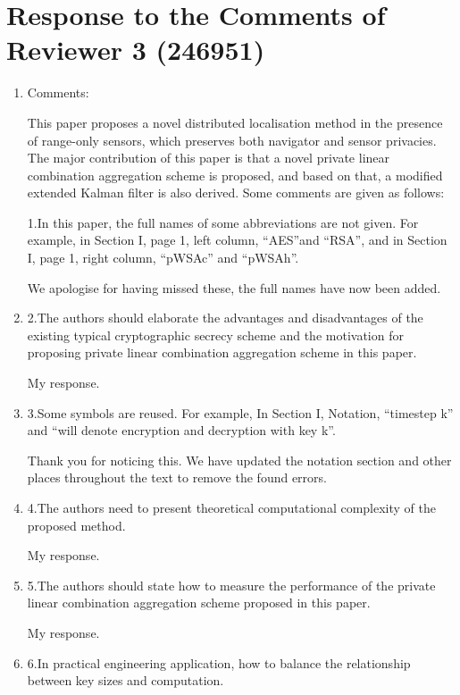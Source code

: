 \documentclass[a4paper]{scrartcl}
\newenvironment{rebuttal}{\begin{enumerate}[label={\color{grey}\thesection.\arabic{enumi}},leftmargin=0pt,ref=\thesection.\arabic{enumi}]}{\end{enumerate}}
\newcommand{\reviewtext}[1]{{\color{nblue} #1}}
\begin{document}
\section*{Response to the Comments of Reviewer 3 (246951)}
\def\thesection{R3}
\begin{rebuttal}
\item \reviewtext{Comments:

This paper proposes a novel distributed localisation method in the presence of range-only sensors, which preserves both navigator and sensor privacies. The major contribution of this paper is that a novel private linear combination aggregation scheme is proposed, and based on that, a modified extended Kalman filter is also derived. Some comments are given as follows:

1.In this paper, the full names of some abbreviations are not given. For example, in Section I, page 1, left column, “AES”and “RSA”, and in Section I, page 1, right column, “pWSAc” and “pWSAh”.}

We apologise for having missed these, the full names have now been added.

\item \reviewtext{2.The authors should elaborate the advantages and disadvantages of the existing typical cryptographic secrecy scheme and the motivation for proposing private linear combination aggregation scheme in this paper.}

My response.

\item \reviewtext{3.Some symbols are reused. For example, In Section I, Notation, “timestep k” and “will denote encryption and decryption with key k”.}

Thank you for noticing this. We have updated the notation section and other places throughout the text to remove the found errors.

\item \reviewtext{4.The authors need to present theoretical computational complexity of the proposed method.}

My response.

\item \reviewtext{5.The authors should state how to measure the performance of the private linear combination aggregation scheme proposed in this paper.}

My response.

\item \reviewtext{6.In practical engineering application, how to balance the relationship between key sizes and computation.}


\end{rebuttal}
\end{document}
